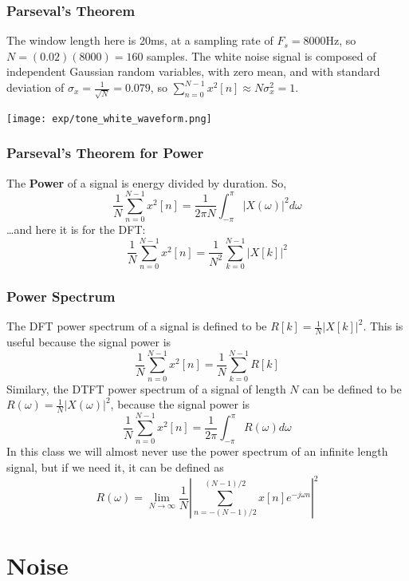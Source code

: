 \documentclass{beamer}
\begin{document}
\begin{frame}
  \frametitle{Parseval's Theorem}

  The window length here is 20ms, at a sampling rate of $F_s=8000$Hz,
  so $N=(0.02)(8000)=160$ samples.  The white noise signal is composed
  of independent Gaussian random variables, with zero mean, and with
  standard deviation of $\sigma_x=\frac{1}{\sqrt{N}}=0.079$, so
  $\sum_{n=0}^{N-1}x^2[n] \approx N\sigma_x^2 = 1$.
  
  \centerline{\texttt{[image: exp/tone\_white\_waveform.png]}}
\end{frame}

\begin{frame}
  \frametitle{Parseval's Theorem for Power}

  The {\bf Power} of a signal is energy divided by duration.  So,
  \[
  \frac{1}{N}\sum_{n=0}^{N-1}x^2[n] = \frac{1}{2\pi N}\int_{-\pi}^{\pi}\left|X(\omega)\right|^2d\omega
  \]
  \ldots and here it is for the DFT:
  \[
  \frac{1}{N}\sum_{n=0}^{N-1}x^2[n] = \frac{1}{N^2}\sum_{k=0}^{N-1}\left|X[k]\right|^2
  \]  
\end{frame}


\begin{frame}
  \frametitle{Power Spectrum}

  The DFT power spectrum of a signal is defined to be $R[k]=\frac{1}{N}|X[k]|^2$.  This is
  useful because the signal power is
  \[
  \frac{1}{N}\sum_{n=0}^{N-1}x^2[n] = \frac{1}{N} \sum_{k=0}^{N-1}R[k]
  \]  
  Similary, the DTFT power spectrum of a signal of length $N$ can be defined to be
  $R(\omega)=\frac{1}{N}|X(\omega)|^2$, because the signal power is
  \[
  \frac{1}{N}\sum_{n=0}^{N-1}x^2[n] = \frac{1}{2\pi}\int_{-\pi}^{\pi}R(\omega)d\omega
  \]
  In this class we will almost never use the power spectrum of an
  infinite length signal, but if we need it, it can be defined as
  \[
  R(\omega) = \lim_{N\rightarrow\infty}\frac{1}{N}\left|\sum_{n=-(N-1)/2}^{(N-1)/2} x[n]e^{-j\omega n}\right|^2
  \]
\end{frame}

\section[Noise]{Noise}
\setcounter{subsection}{1}
\end{document}
